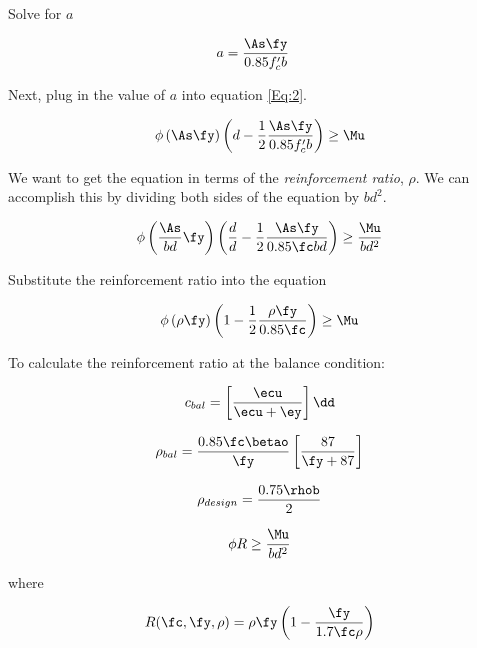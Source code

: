 Solve for $a$

\begin{align}
	a&=\frac{\As \fy}{0.85f'_cb}
\end{align}


Next, plug in the value of $a$ into equation \ref{Eq:2}.

\begin{align}
	\phi
	\left(\As \fy\right)
	\left(d-\frac{1}{2}\frac{\As \fy}{0.85f'_cb}\right)
	\geq
	\Mu
\end{align}

We want to get the equation in terms of the \textit{reinforcement ratio}, $\rho$. We can accomplish this by dividing both sides of the equation by $bd^2$.


\begin{align}
	\phi
	\left(\frac{\As}{bd} \fy\right)
	\left(\frac{d}{d} - \frac12\frac{\As\fy}{0.85\fc bd}\right)
	\geq
	\frac{\Mu}{bd^2}
\end{align}


Substitute the reinforcement ratio into the equation

\begin{align}
	\phi
	\left(\rho \fy\right)
	\left(1 - \frac12\frac{\rho \fy}{0.85 \fc}\right)
	\geq
	\Mu
\end{align}



To calculate the reinforcement ratio at the balance condition:

\begin{align}
	c_{bal} =
	\left[
		\frac{\ecu}{\ecu + \ey}
	\right]
	\dd
\end{align}


\begin{align}
	\rho_{bal} = 
	\frac{0.85\fc\betao}{\fy}
	\left[
		\frac{87}{\fy+87}
	\right]
\end{align}



\begin{align}
	\rho_{design}=\frac{0.75\rhob}{2}
\end{align}


\begin{align}
	\phi R \geq \frac{\Mu}{bd^2}
	\label{Eq:design2}
\end{align}

where

\begin{align}
	R(\fc,\fy,\rho) = 
	\rho \fy 
	\left(1-\frac{\fy}{1.7\fc \rho}\right)
\end{align}



